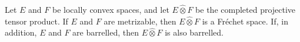 Let $E$ and $F$ be locally convex spaces, and let $E \hat{\otimes} F$ be the completed projective tensor product. If $E$ and $F$ are metrizable, then $E \hat{\otimes} F$ is a Fréchet space. If, in addition, $E$ and $F$ are barrelled, then $E \hat{\otimes} F$ is also barrelled.
